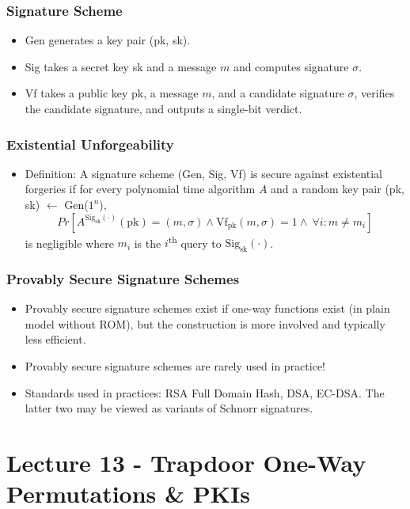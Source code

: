 \documentclass[a4paper]{scrartcl}
\newcommand{\ts}{\textsuperscript}
\begin{document}
\subsubsection*{Signature Scheme}

\begin{itemize}
\item Gen generates a key pair (pk, sk).
\item Sig takes a secret key sk and a message $m$ and computes signature $\sigma$.
\item Vf takes a public key pk, a message $m$, and a candidate signature $\sigma$, verifies the candidate signature, and outputs a single-bit verdict.
\end{itemize}

\subsubsection*{Existential Unforgeability}

\begin{itemize}
\item Definition: A signature scheme (Gen, Sig, Vf) is secure against existential forgeries if for every polynomial time algorithm $A$ and a random key pair (pk, sk) $\gets$ Gen($1^n$),
$$Pr[A^{\text{Sig}_{\text{sk}}(\cdot)}(\text{pk}) = (m, \sigma) \land \text{Vf}_{\text{pk}}(m,\sigma) = 1 \land\ \forall i : m \neq m_i]$$
is negligible where $m_i$ is the $i$\ts{th} query to $\text{Sig}_{\text{sk}}(\cdot)$.
\end{itemize}

\subsubsection*{Provably Secure Signature Schemes}

\begin{itemize}
\item Provably secure signature schemes exist if one-way functions exist (in plain model without ROM), but the construction is more involved and typically less efficient.
\item Provably secure signature schemes are rarely used in practice!
\item Standards used in practices: RSA Full Domain Hash, DSA, EC-DSA. The latter two may be viewed as variants of Schnorr signatures.
\end{itemize}

\section*{Lecture 13 - Trapdoor One-Way Permutations \& PKIs}
\end{document}
